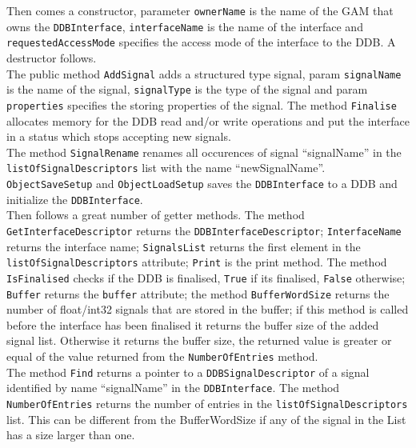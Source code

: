 Then comes a constructor, parameter \texttt{ownerName} is the name of the GAM that owns the \texttt{DDBInterface}, \texttt{interfaceName} is the name of the interface and \texttt{requestedAccessMode} specifies the access mode of the interface to the DDB. A destructor follows. \\


The public method \texttt{AddSignal} adds a structured type signal, param \texttt{signalName} is the name of the signal, \texttt{signalType} is the type of the signal and param \texttt{properties} specifies the storing properties of the signal. The method \texttt{Finalise} allocates memory for the DDB read and/or write operations and put the interface in a status which stops accepting new signals. \\


The method \texttt{SignalRename} renames all occurences of signal ``signalName'' in the \texttt{listOfSignalDescriptors} list with the name ``newSignalName''. \texttt{ObjectSaveSetup} and \texttt{ObjectLoadSetup} saves the \texttt{DDBInterface} to a DDB and initialize the \texttt{DDBInterface}. \\


Then follows a great number of getter methods. The method \texttt{GetInterfaceDescriptor} returns the \texttt{DDBInterfaceDescriptor}; \texttt{InterfaceName} returns the interface name; \texttt{SignalsList} returns the first element in the \texttt{listOfSignalDescriptors} attribute; \texttt{Print} is the print method. The method \texttt{IsFinalised} checks if the DDB is finalised, \texttt{True} if its finalised, \texttt{False} otherwise; \texttt{Buffer} returns the \texttt{buffer} attribute; the method \texttt{BufferWordSize} returns the number of float/int32 signals that are stored in the buffer; if this method is called before the interface has been finalised it returns the buffer size of the added signal list. Otherwise it returns the buffer size, the returned value is greater or equal of the value returned from the \texttt{NumberOfEntries} method. \\


The method \texttt{Find} returns a pointer to a \texttt{DDBSignalDescriptor} of a signal identified by name ``signalName'' in the \texttt{DDBInterface}. The method \texttt{NumberOfEntries} returns the number of entries in the \texttt{listOfSignalDescriptors} list. This can be different from the BufferWordSize if any of the signal in the List has a size larger than one. \\


